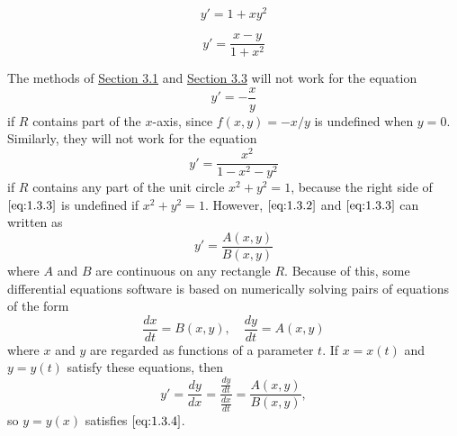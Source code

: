\documentclass{ximera}
\begin{document}
\begin{example}\label{ex:fig010303}
$$
y'=1+xy^2
$$

\begin{center}  
\end{center}

\end{example}
\begin{example}\label{ex:fig010304}
$$
y'=\frac{x-y}{1+x^2}
$$

\begin{center}  
\end{center}

\end{example}
The methods of \href{https://xerxes.ximera.org/differentialequations/main/eulersMethod/eulersMethod}{Section 3.1} and \href{https://xerxes.ximera.org/differentialequations/main/rungeKutta/rungeKutta}{Section 3.3} will not work for the equation
\begin{equation} \label{eq:1.3.2}
y'=-\frac{x}{y}
\end{equation}
if $R$ contains part of the $x$-axis, since $f(x,y)=-x/y$ is undefined
when $y=0$. Similarly, they will not work for the equation
\begin{equation} \label{eq:1.3.3}
y'=\frac{x^2}{1-x^2-y^2}
\end{equation}
if $R$ contains any part of the unit circle $x^2+y^2=1$, because the
right side of $\eqref{eq:1.3.3}$ is undefined if $x^2+y^2=1$. However,
$\eqref{eq:1.3.2}$ and $\eqref{eq:1.3.3}$ can written as
\begin{equation} \label{eq:1.3.4}
y'=\frac{A(x,y)}{B(x,y)}
\end{equation}
where $A$ and $B$ are continuous on any rectangle $R$. Because of
this, some differential equations software is based on
numerically solving pairs of equations of the form
\begin{equation} \label{eq:1.3.5}
\frac{dx}{dt}=B(x,y),\quad \frac{dy}{dt}=A(x,y)
\end{equation}
where $x$ and $y$ are regarded as functions of a parameter $t$.
If $x=x(t)$ and $y=y(t)$  satisfy these equations, then
$$
y'=\frac{dy}{dx}=\frac{\frac{dy}{dt}}{\frac{dx}{dt}}=\frac{A(x,y)}{B(x,y)},
$$
so $y=y(x)$ satisfies $\eqref{eq:1.3.4}$.
 
\end{document}

